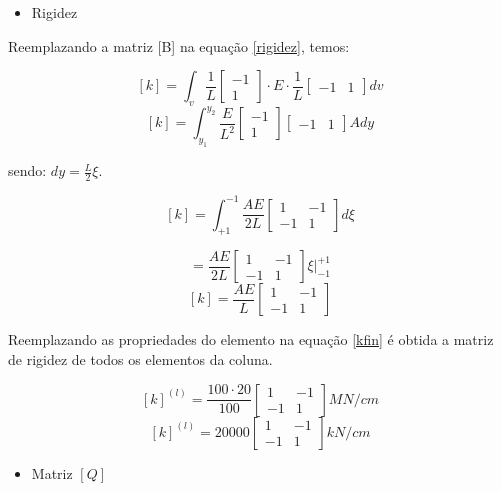 \documentclass{article} %
\begin{document}
\begin{itemize}
	\item Rigidez
\end{itemize}

 \indent Reemplazando a matriz [B] na equação \ref{rigidez}, temos:

 \begin{equation}\label{}
[k]= \int_{v}\frac{1}{L}\begin{bmatrix}
-1  \\
1
\end{bmatrix}\cdot E\cdot \frac{1}{L}\begin{bmatrix}
-1&1
\end{bmatrix}dv
\end{equation}
 \begin{equation*}\label{}
[k]= \int_{y_1}^{y_2}\frac{E}{L^2}\begin{bmatrix}
-1  \\
1
\end{bmatrix}\begin{bmatrix}
-1&1
\end{bmatrix}Ady
\end{equation*}

\indent sendo: \(dy=\frac{L}{2}\xi\).

 \begin{equation*}\label{}
[k]= \int_{+1}^{-1}\frac{AE}{2L}\begin{bmatrix}
1 &-1 \\
-1&1
\end{bmatrix}d\xi
\end{equation*}

 \begin{equation*}
[k]= \frac{AE}{2L}\begin{bmatrix}
1 &-1 \\
-1&1
\end{bmatrix}\xi\biggr|_{-1}^{+1}
\end{equation*}
 \begin{equation}\label{kfin}
[k]= \frac{AE}{L}\begin{bmatrix}
1 &-1 \\
-1&1
\end{bmatrix}
\end{equation}

\indent Reemplazando as propriedades do elemento na equação \ref{kfin} é obtida a matriz de rigidez de todos os elementos da coluna.

 \begin{equation*}\label{}
[k]^{(l)}= \frac{100 \cdot 20}{100}\begin{bmatrix}
1 &-1 \\
-1&1
\end{bmatrix}MN/cm
\end{equation*}
 \begin{equation*}\label{}
[k]^{(l)}= 20000\begin{bmatrix}
1 &-1 \\
-1&1
\end{bmatrix}kN/cm
\end{equation*}
\begin{itemize}
	\item Matriz \([Q]\)
\end{itemize}
\end{document}
